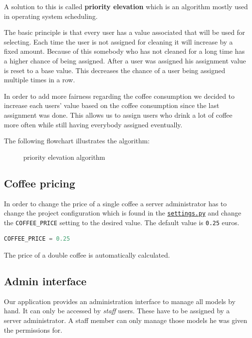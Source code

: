 A solution to this is called \textbf{priority elevation} which is an
algorithm mostly used in operating system scheduling.

The basic principle is that every user has a value associated that will
be used for selecting. Each time the user is not assigned for cleaning
it will increase by a fixed amount. Because of this somebody who has not
cleaned for a long time has a higher chance of being assigned. After a
user was assigned his assignment value is reset to a base value. This
decreases the chance of a user being assigned multiple times in a row.

In order to add more fairness regarding the coffee consumption we
decided to increase each users' value based on the coffee consumption
since the last assignment was done. This allows us to assign users who
drink a lot of coffee more often while still having everybody assigned
eventually.

The following flowchart illustrates the algorithm:

\begin{figure}[htbp]
\centering
{}
\caption{priority elevation algorithm}
\end{figure}

\subsection{Coffee pricing}\label{coffee-pricing}

In order to change the price of a single coffee a server administrator
has to change the project configuration which is found in the
\href{../../server/server/settings.py}{\texttt{settings.py}} and change
the \texttt{COFFEE\_PRICE} setting to the desired value. The default
value is \texttt{0.25} euros.

\begin{lstlisting}[language=python]
COFFEE_PRICE = 0.25
\end{lstlisting}

The price of a double coffee is automatically calculated.

\subsection{Admin interface}\label{admin-interface}

Our application provides an administration interface to manage all
models by hand. It can only be accessed by \emph{staff} users. These
have to be assigned by a server administrator. A staff member can only
manage those models he was given the permissions for.

